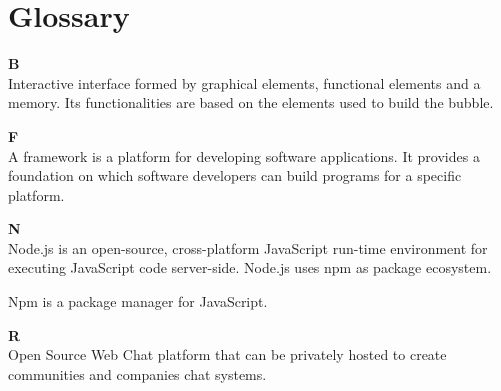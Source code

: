 \section{Glossary}

\textbf{\huge{B}}\\
Interactive interface formed by graphical elements, functional elements and a memory. Its functionalities are based on the elements used to build the bubble.

\textbf{\huge{F}}\\
A framework is a platform for developing software applications. It provides a foundation on which software developers can build programs for a specific platform.

\textbf{\huge{N}}\\
Node.js is an open-source, cross-platform JavaScript run-time environment for executing JavaScript code server-side.
Node.js uses npm as package ecosystem. 

Npm is a package manager for JavaScript. 

\textbf{\huge{R}}\\
Open Source Web Chat platform that can be privately hosted to create communities and companies chat systems.


